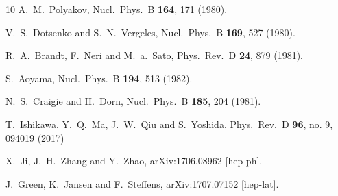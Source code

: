 \documentclass[final,5p,times,twocolumn]{elsarticle}
\begin{document}
\begin{thebibliography}{10}
  A.~M.~Polyakov,
  Nucl.\ Phys.\ B {\bf 164}, 171 (1980).


  V.~S.~Dotsenko and S.~N.~Vergeles,
  Nucl.\ Phys.\ B {\bf 169}, 527 (1980).


  R.~A.~Brandt, F.~Neri and M.~a.~Sato,
  Phys.\ Rev.\ D {\bf 24}, 879 (1981).


  S.~Aoyama,
  Nucl.\ Phys.\ B {\bf 194}, 513 (1982).


  N.~S.~Craigie and H.~Dorn,
  Nucl.\ Phys.\ B {\bf 185}, 204 (1981).


  T.~Ishikawa, Y.~Q.~Ma, J.~W.~Qiu and S.~Yoshida,
  Phys.\ Rev.\ D {\bf 96}, no. 9, 094019 (2017)


  X.~Ji, J.~H.~Zhang and Y.~Zhao,
  arXiv:1706.08962 [hep-ph].


  J.~Green, K.~Jansen and F.~Steffens,
  arXiv:1707.07152 [hep-lat].



\end{thebibliography}
\end{document}
